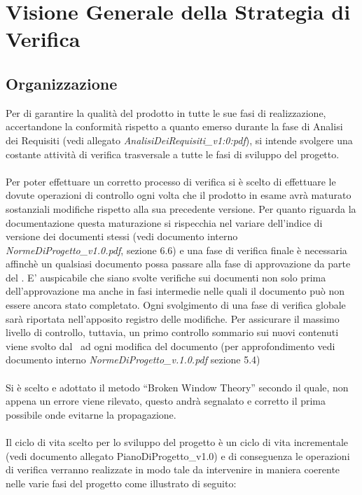 \section{Visione Generale della Strategia di Verifica}

\subsection{Organizzazione}

Per di garantire la qualità del prodotto in tutte le sue fasi di realizzazione, accertandone la conformità rispetto a quanto emerso durante la fase di Analisi dei Requisiti (vedi allegato \textit{AnalisiDeiRequisiti\_v1:0:pdf}), si intende svolgere una costante attività di verifica trasversale a tutte le fasi di sviluppo del progetto.\\ \\
Per poter effettuare un corretto processo di verifica si è scelto di effettuare le
dovute operazioni di controllo ogni volta che il prodotto in esame avrà maturato sostanziali modifiche rispetto alla sua precedente versione. Per quanto riguarda la documentazione questa maturazione si rispecchia nel variare dell'indice di versione dei documenti stessi (vedi documento interno \textit{NormeDiProgetto\_v1.0.pdf}, sezione 6.6) e una fase di verifica finale è necessaria affinchè un qualsiasi documento possa passare alla fase di approvazione da parte del \ruoloResponsabile. E' auspicabile che siano svolte verifiche sui documenti non solo prima dell'approvazione ma anche in fasi intermedie nelle quali il documento può non essere ancora stato completato. Ogni svolgimento di una fase di verifica globale sarà riportata nell'apposito registro delle modifiche. Per assicurare il massimo livello di controllo, tuttavia, un primo controllo sommario sui nuovi contenuti viene svolto dal \ruoloVerificatore\ ad ogni modifica del documento (per approfondimento vedi documento interno  \textit{NormeDiProgetto\_v.1.0.pdf} sezione 5.4)
\\ \\
Si è scelto e adottato il metodo “Broken Window Theory” secondo il quale, non appena un errore viene rilevato, questo andrà segnalato e corretto il prima possibile onde evitarne la propagazione.
\\ \\
Il ciclo di vita scelto per lo sviluppo del progetto è un ciclo di vita incrementale (vedi documento allegato PianoDiProgetto\_v1.0) e di conseguenza le
operazioni di verifica verranno realizzate in modo tale da intervenire in maniera
coerente nelle varie fasi del progetto come illustrato di seguito:

